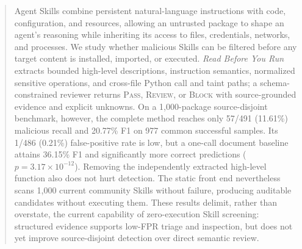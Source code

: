 \begin{abstract}
Agent Skills combine persistent natural-language instructions with code,
configuration, and resources, allowing an untrusted package to shape an
agent's reasoning while inheriting its access to files, credentials, networks,
and processes. We study whether malicious Skills can be filtered before any
target content is installed, imported, or executed. \emph{Read Before You Run}
extracts bounded high-level descriptions, instruction semantics, normalized
sensitive operations, and cross-file Python call and taint paths; a
schema-constrained reviewer returns \textsc{Pass}, \textsc{Review}, or
\textsc{Block} with source-grounded evidence and explicit unknowns. On a
1,000-package source-disjoint benchmark, however, the complete method reaches
only 57/491 (11.61\%) malicious recall and 20.77\% F1 on 977 common successful
samples. Its 1/486 (0.21\%) false-positive rate is low, but a one-call document
baseline attains 36.15\% F1 and significantly more correct predictions
($p=3.17\times10^{-12}$). Removing the independently extracted high-level
function also does not hurt detection. The static front end nevertheless scans
1,000 current community Skills without failure, producing auditable candidates
without executing them. These results delimit, rather than overstate, the
current capability of zero-execution Skill screening: structured evidence
supports low-FPR triage and inspection, but does not yet improve source-disjoint
detection over direct semantic review.
\end{abstract}
